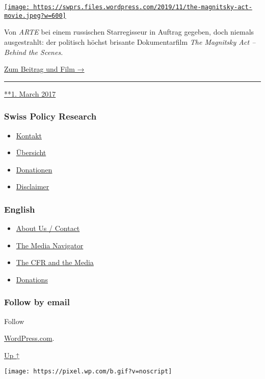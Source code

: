\href{https://swprs.org/2017/03/01/magnitsky/}{\texttt{[image: https://swprs.files.wordpress.com/2019/11/the-magnitsky-act-movie.jpeg?w=600]}}

Von \emph{ARTE} bei einem russischen Star­re­gisseur in Auftrag gegeben,
doch niemals ausgestrahlt: der politisch höchst brisante
Doku­men­tar­film \emph{The Magnitsky Act -- Behind the Scenes.}

\href{https://swprs.org/der-fall-magnitsky/}{Zum Beitrag und Film →}

\begin{center}\rule{0.5\linewidth}{\linethickness}\end{center}

\href{https://swprs.org/2017/03/01/magnitsky/}{**1. March 2017}

\hypertarget{swiss-policy-research}{%
\subsubsection{Swiss Policy Research}\label{swiss-policy-research}}

\begin{itemize}
\tightlist
\item
  \href{https://swprs.org/kontakt/}{Kontakt}
\item
  \href{https://swprs.org/uebersicht/}{Übersicht}
\item
  \href{https://swprs.org/donationen/}{Donationen}
\item
  \href{https://swprs.org/disclaimer/}{Disclaimer}
\end{itemize}

\hypertarget{english}{%
\subsubsection{English}\label{english}}

\begin{itemize}
\tightlist
\item
  \href{https://swprs.org/contact/}{About Us / Contact}
\item
  \href{https://swprs.org/media-navigator/}{The Media Navigator}
\item
  \href{https://swprs.org/the-american-empire-and-its-media/}{The CFR
  and the Media}
\item
  \href{https://swprs.org/donations/}{Donations}
\end{itemize}

\hypertarget{follow-by-email}{%
\subsubsection{Follow by email}\label{follow-by-email}}

Follow

\href{https://wordpress.com/?ref=footer_custom_com}{WordPress.com}.

\protect\hyperlink{}{Up ↑}

\texttt{[image: https://pixel.wp.com/b.gif?v=noscript]}
